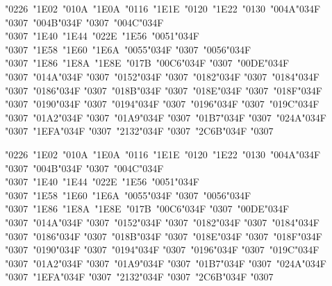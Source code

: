 \documentclass[10pt]{article}
\newcommand{\cgj}{\char"034F }
\begin{document}
\par\noindent{}\parbox[t]{\dimexpr\linewidth-2.4cm}{\PropB\fontsize{18}{30}\selectfont\raggedright {\color{pre}\char"0226}\ {\color{pre}\char"1E02}\ {\color{pre}\char"010A}\ {\color{pre}\char"1E0A}\ {\color{pre}\char"0116}\ {\color{pre}\char"1E1E}\ {\color{pre}\char"0120}\ {\color{pre}\char"1E22}\ {\color{pre}\char"0130}\ \char"004A\cgj\char"0307\ \char"004B\cgj\char"0307\ \char"004C\cgj\char"0307\ {\color{pre}\char"1E40}\ {\color{pre}\char"1E44}\ {\color{pre}\char"022E}\ {\color{pre}\char"1E56}\ \char"0051\cgj\char"0307\ {\color{pre}\char"1E58}\ {\color{pre}\char"1E60}\ {\color{pre}\char"1E6A}\ \char"0055\cgj\char"0307\ \char"0056\cgj\char"0307\ {\color{pre}\char"1E86}\ {\color{pre}\char"1E8A}\ {\color{pre}\char"1E8E}\ {\color{pre}\char"017B}\ \char"00C6\cgj\char"0307\ \char"00DE\cgj\char"0307\ \char"014A\cgj\char"0307\ \char"0152\cgj\char"0307\ \char"0182\cgj\char"0307\ \char"0184\cgj\char"0307\ \char"0186\cgj\char"0307\ \char"018B\cgj\char"0307\ \char"018E\cgj\char"0307\ \char"018F\cgj\char"0307\ \char"0190\cgj\char"0307\ \char"0194\cgj\char"0307\ \char"0196\cgj\char"0307\ \char"019C\cgj\char"0307\ \char"01A2\cgj\char"0307\ \char"01A9\cgj\char"0307\ \char"01B7\cgj\char"0307\ \char"024A\cgj\char"0307\ \char"1EFA\cgj\char"0307\ \char"2132\cgj\char"0307\ \char"2C6B\cgj\char"0307}\par
\par\noindent{}\parbox[t]{\dimexpr\linewidth-2.4cm}{\PropBI\fontsize{18}{30}\selectfont\raggedright {\color{pre}\char"0226}\ {\color{pre}\char"1E02}\ {\color{pre}\char"010A}\ {\color{pre}\char"1E0A}\ {\color{pre}\char"0116}\ {\color{pre}\char"1E1E}\ {\color{pre}\char"0120}\ {\color{pre}\char"1E22}\ {\color{pre}\char"0130}\ \char"004A\cgj\char"0307\ \char"004B\cgj\char"0307\ \char"004C\cgj\char"0307\ {\color{pre}\char"1E40}\ {\color{pre}\char"1E44}\ {\color{pre}\char"022E}\ {\color{pre}\char"1E56}\ \char"0051\cgj\char"0307\ {\color{pre}\char"1E58}\ {\color{pre}\char"1E60}\ {\color{pre}\char"1E6A}\ \char"0055\cgj\char"0307\ \char"0056\cgj\char"0307\ {\color{pre}\char"1E86}\ {\color{pre}\char"1E8A}\ {\color{pre}\char"1E8E}\ {\color{pre}\char"017B}\ \char"00C6\cgj\char"0307\ \char"00DE\cgj\char"0307\ \char"014A\cgj\char"0307\ \char"0152\cgj\char"0307\ \char"0182\cgj\char"0307\ \char"0184\cgj\char"0307\ \char"0186\cgj\char"0307\ \char"018B\cgj\char"0307\ \char"018E\cgj\char"0307\ \char"018F\cgj\char"0307\ \char"0190\cgj\char"0307\ \char"0194\cgj\char"0307\ \char"0196\cgj\char"0307\ \char"019C\cgj\char"0307\ \char"01A2\cgj\char"0307\ \char"01A9\cgj\char"0307\ \char"01B7\cgj\char"0307\ \char"024A\cgj\char"0307\ \char"1EFA\cgj\char"0307\ \char"2132\cgj\char"0307\ \char"2C6B\cgj\char"0307}\par
\end{document}
